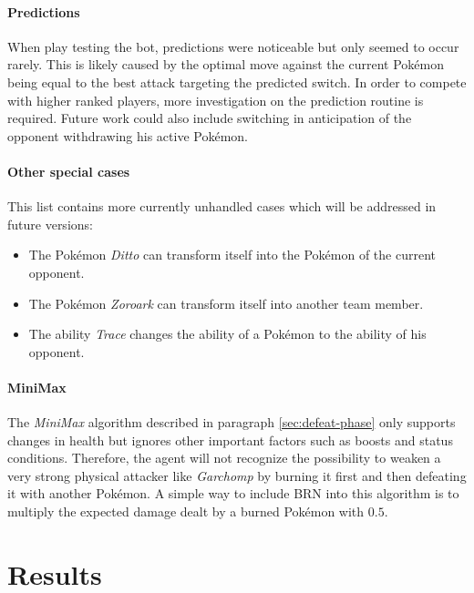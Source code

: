 \paragraph{Predictions}
\label{par:predictions}
When play testing the bot, predictions were noticeable but only seemed to occur rarely. This is 
likely caused by the optimal move against the current Pokémon being equal to the best attack
targeting the predicted switch. In order to compete with higher ranked players, more investigation
on the prediction routine is required. Future work could also include switching in anticipation
of the opponent withdrawing his active Pokémon.

\paragraph{Other special cases}
This list contains more currently unhandled cases which will be addressed in future versions:
\begin{itemize}
  \item The Pokémon \textit{Ditto} can transform itself into the Pokémon of the current opponent.
  \item The Pokémon \textit{Zoroark} can transform itself into another team member. 
  \item The ability \textit{Trace} changes the ability of a Pokémon to the ability of his opponent.
\end{itemize}

\paragraph{MiniMax}
The \textit{MiniMax} algorithm described in paragraph \ref{sec:defeat-phase} only supports changes in health
but ignores other important factors such as boosts and status conditions. Therefore, the agent will 
not recognize the possibility to weaken a very strong physical attacker like \textit{Garchomp} by burning
it first and then defeating it with another Pokémon. A simple way to include \ac{BRN} into this algorithm
is to multiply the expected damage dealt by a burned Pokémon with $0.5$. 

\section{Results}
